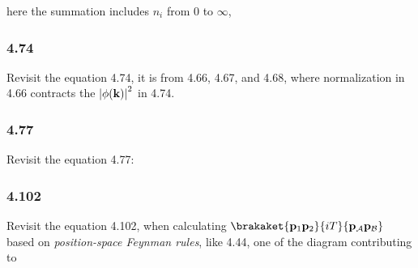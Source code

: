 here the summation includes $n_i$ from $0$ to $\infty$,


\subsubsection{4.74}

Revisit the equation 4.74, it is from 4.66, 4.67, and 4.68,
where normalization in 4.66 contracts the $\left| \phi(\mathbf{k}) \right|^2$ in 4.74.

\subsubsection{4.77}

Revisit the equation 4.77:


\subsubsection{4.102}

Revisit the equation 4.102, when calculating $\brakaket{\bf{p}_1\bf{p}_2}{iT}{\bf{p}_\mathcal{A}\bf{p}_\mathcal{B}}$ based on \textit{position-space Feynman rules},
like 4.44, one of the diagram contributing to

